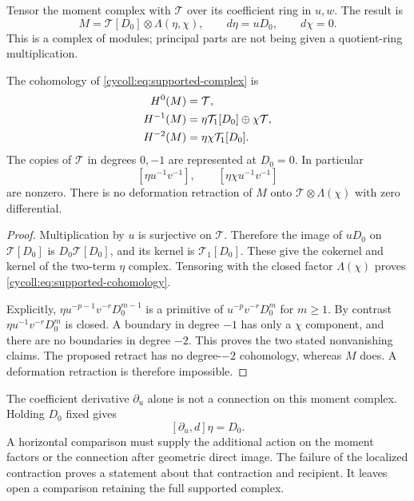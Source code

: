 Tensor the moment complex with $\mathcal T$ over its coefficient
ring in $u,w$. The result is
\begin{equation}\label{cycoll:eq:supported-complex}
 M=\mathcal T[D_0]\otimes\Lambda(\eta,\chi),\qquad
 d\eta=uD_0,\qquad d\chi=0.
\end{equation}
This is a complex of modules; principal parts are not being
given a quotient-ring multiplication.

\begin{proposition}\label{cycoll:prop:supported}
The cohomology of \eqref{cycoll:eq:supported-complex} is
\begin{align}
 H^0(M)&=\mathcal T,\notag\\
 H^{-1}(M)&=\eta\mathcal T_1[D_0]\oplus\chi\mathcal T,
       \label{cycoll:eq:supported-cohomology}\\
 H^{-2}(M)&=\eta\chi\mathcal T_1[D_0].\notag
\end{align}
The copies of $\mathcal T$ in degrees $0,-1$ are represented
at $D_0=0$. In particular
\[
 [\eta u^{-1}v^{-1}],\qquad[\eta\chi u^{-1}v^{-1}]
\]
are nonzero. There is no deformation retraction of $M$ onto
$\mathcal T\otimes\Lambda(\chi)$ with zero differential.
\end{proposition}
\begin{proof}
Multiplication by $u$ is surjective on $\mathcal T$. Therefore
the image of $uD_0$ on $\mathcal T[D_0]$ is
$D_0\mathcal T[D_0]$, and its kernel is $\mathcal T_1[D_0]$.
These give the cokernel and kernel of the two-term $\eta$
complex. Tensoring with the closed factor $\Lambda(\chi)$
proves \eqref{cycoll:eq:supported-cohomology}.

Explicitly, $\eta u^{-p-1}v^{-r}D_0^{m-1}$ is a primitive
of $u^{-p}v^{-r}D_0^m$ for $m\geq1$. By contrast
$\eta u^{-1}v^{-r}D_0^m$ is closed. A boundary in degree $-1$
has only a $\chi$ component, and there are no boundaries in
degree $-2$. This proves the two stated nonvanishing claims.
The proposed retract has no degree-$-2$ cohomology, whereas
$M$ does. A deformation retraction is therefore impossible.
\end{proof}

The coefficient derivative $\partial_u$ alone is not a
connection on this moment complex. Holding $D_0$ fixed gives
\[
 [\partial_u,d]\eta=D_0.
\]
A horizontal comparison must supply the additional action on
the moment factors or the connection after geometric direct
image. The failure of the localized contraction proves a
statement about that contraction and recipient. It leaves open
a comparison retaining the full supported complex.

